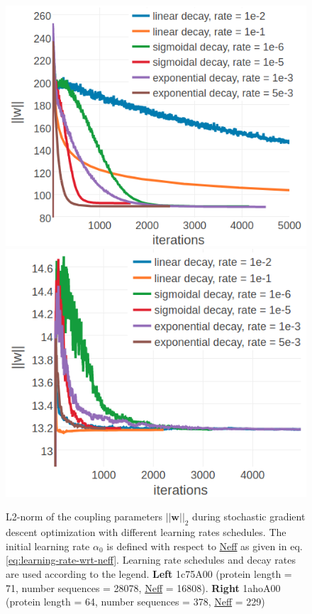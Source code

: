 \documentclass[11pt,a4paper,twoside]{book}
\newcommand{\w}{\mathbf{w}}
\theoremstyle{definition}
\theoremstyle{definition}
\theoremstyle{remark}
\begin{document}
\begin{figure}

{\centering \includegraphics[width=0.48\linewidth]{img/full_likelihood/sgd/parameter_norm_1c75a00_alpha0_different_schedules} \includegraphics[width=0.48\linewidth]{img/full_likelihood/sgd/parameter_norm_1ahoa00_alpha0_different_schedules} 

}

\caption{L2-norm of the
coupling parameters \(||\w||_2\) during stochastic gradient descent
optimization with different learning rates schedules. The initial
learning rate \(\alpha_0\) is defined with respect to
\protect\hyperlink{abbrev}{Neff} as given in eq.
\eqref{eq:learning-rate-wrt-neff}. Learning rate schedules and decay rates
are used according to the legend. \textbf{Left} 1c75A00 (protein length
= 71, number sequences = 28078, \protect\hyperlink{abbrev}{Neff} =
16808). \textbf{Right} 1ahoA00 (protein length = 64, number sequences =
378, \protect\hyperlink{abbrev}{Neff} = 229)}\label{fig:sgd-single-proteins-learning-rate-schedule}
\end{figure}
\end{document}
